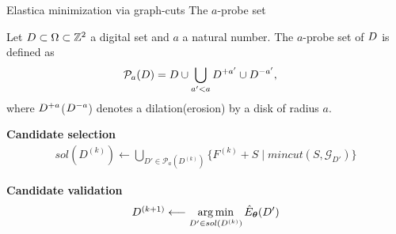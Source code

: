 \begin{frame}
{Elastica minimization via graph-cuts}
{The $a$-probe set}

\begin{definition}
	Let $D \subset \Omega \subset \mathbb{Z}^2$ a digital set and $a$ a natural number. The $a$-probe set of $D$ is defined as
	\begin{align*}
		\mathcal{P}_a(D) &= D \cup \bigcup_{a' < a}{D^{+a'} \cup D^{-a'}},
	\end{align*}
	where $D^{+a}$($D^{-a}$) denotes a dilation(erosion) by a disk of radius $a$.
\end{definition}

\textbf{Candidate selection}
\[\begin{array}{l}
	sol(D^{(k)}) \longleftarrow \bigcup_{D' \in \mathcal{P}_a(D^{(k)})} \Big\{ F^{(k)} + S  \; | \; mincut(S,\mathcal{G}_{D'}) \Big\} 	
\end{array}
\]

\textbf{Candidate validation}
\[\begin{array}{l}
D^{(k+1)} \longleftarrow \displaystyle \operatorname*{arg\,min}_{ D' \in sol(D^{(k)}) }{ \hat{E}_{\bm{\theta}}(D')}
\end{array}
\]

\end{frame}


